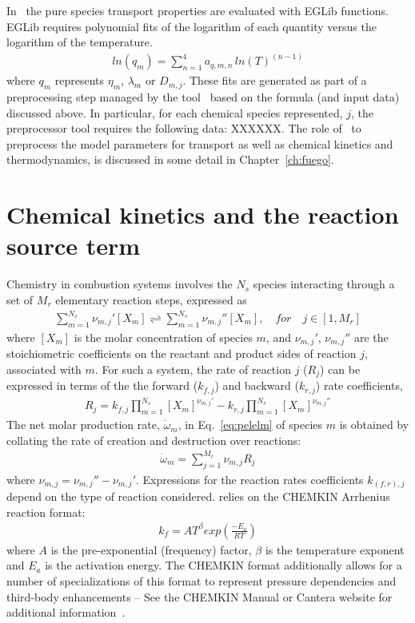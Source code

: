 In \pelelm\ the pure species transport properties are evaluated with EGLib functions.  EGLib requires polynomial fits of the logarithm of each quantity versus the logarithm of the temperature.
\begin{eqnarray*}
ln(q_m) = \sum_{n=1}^4 a_{q,m,n} \, ln(T)^{(n-1)} 
\end{eqnarray*}
where $q_m$ represents $\eta_m$, $\lambda_m$ or $D_{m,j}$. These fits are generated as part of a preprocessing step managed by the tool \fuego\ based on the formula (and input data) discussed above.  In particular, for each chemical species represented, $j$, the preprocessor tool requires the following data: XXXXXX.  The role of \fuego\ to preprocess the model parameters for transport as well as chemical kinetics and thermodynamics, is discussed in some detail in Chapter~\ref{ch:fuego}.

\section{Chemical kinetics and the reaction source term}
\label{ChemKinetics}
Chemistry in combustion systems involves the $N_s$ species interacting through a set of $M_r$ elementary reaction steps, expressed as
\begin{eqnarray*}
\sum_{m=1}^{N_s} \nu_{m,j}'[X_m] \rightleftharpoons \sum_{m=1}^{N_s} \nu_{m,j}''[X_m],\quad for \quad j \in [1,M_r] 
\label{IntroKM1}
\end{eqnarray*}
where $[X_m]$ is the molar concentration of species $m$, and $\nu_{m,j}'$, $\nu_{m,j}''$ are the stoichiometric coefficients on the reactant and product sides of reaction $j$, associated with $m$. For such a system, the rate of reaction $j$ ($R_j$) can be expressed in terms of the the forward ($k_{f,j}$) and backward ($k_{r,j}$) rate coefficients,
\begin{eqnarray*} 
R_{j} = k_{f,j}\prod_{m=1}^{N_s}  [X_{m}]^{\nu_{m,j}'}-k_{r,j}\prod_{m=1}^{N_s} [X_{m}]^{\nu_{m,j}''}
\end{eqnarray*}
The net molar production rate, $ \dot{\omega}_m$, in Eq.~\ref{eq:pelelm} of species $m$ is obtained by
collating the rate of creation and destruction over reactions:
\begin{eqnarray*}
\dot{\omega}_m = \sum_{j=1}^{M_r} \nu_{m,j} R_j 
\label{IntroKM3}
\end{eqnarray*}
where $\nu_{m,j} =\nu_{m,j}'' - \nu_{m,j}'$. Expressions for the reaction rates coefficients $k_{(f,r),j}$ depend on the type of reaction considered. \pelelm \; relies on the CHEMKIN Arrhenius reaction format:
\begin{eqnarray*}
k_f = AT^{\beta} exp \left( \frac{-E_a}{RT}\right)
\end{eqnarray*}
where $A$ is the pre-exponential (frequency) factor, $\beta$ is the temperature exponent and $E_a$ is the activation energy. The CHEMKIN format additionally allows for a number of specializations of this format to represent pressure dependencies and third-body enhancements -- See the CHEMKIN Manual or Cantera website for additional information~\cite{Kee:1989,cantera}.

